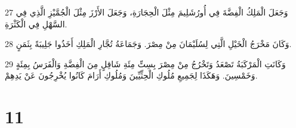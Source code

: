 \par 27 وَجَعَلَ الْمَلِكُ الْفِضَّةَ فِي أُورُشَلِيمَ مِثْلَ الْحِجَارَةِ، وَجَعَلَ الأَرْزَ مِثْلَ الْجُمَّيْزِ الَّذِي فِي السَّهْلِ فِي الْكَثْرَةِ.
\par 28 وَكَانَ مَخْرَجُ الْخَيْلِ الَّتِي لِسُلَيْمَانَ مِنْ مِصْرَ. وَجَمَاعَةُ تُجَّارِ الْمَلِكِ أَخَذُوا جَلِيبَةً بِثَمَنٍ.
\par 29 وَكَانَتِ الْمَرْكَبَةُ تَصْعَدُ وَتَخْرُجُ مِنْ مِصْرَ بِسِتِّ مِئَةِ شَاقِلٍ مِنَ الْفِضَّةِ وَالْفَرَسُ بِمِئَةٍ وَخَمْسِينَ. وَهَكَذَا لِجَمِيعِ مُلُوكِ الْحِثِّيِّينَ وَمُلُوكِ أَرَامَ كَانُوا يُخْرِجُونَ عَنْ يَدِهِمْ.

\chapter{11}

